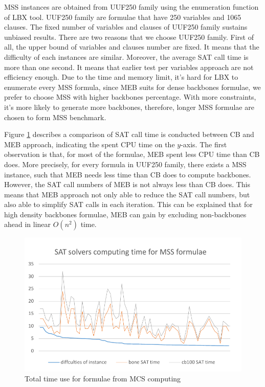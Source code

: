 MSS instances are obtained from UUF250 family using the enumeration function of LBX\cite{MPA2015} tool. UUF250 family are formulae that have 250 variables and 1065 clauses. The fixed number of variables and clauses of UUF250 family sustains unbiased results.
There are two reasons that we choose UUF250 family. First of all, the upper bound of variables and clauses number are fixed. It means that the difficulty of each instances are similar. Moreover, the average SAT call time is more than one second. It means that earlier test per variables approach are not efficiency enough.
Due to the time and memory limit, it's hard for LBX to enumerate every MSS formula, since MEB suits for dense backbones formulae, we prefer to choose MSS with higher backbones percentage. With more constraints, it's more likely to generate more backbones, therefore, longer MSS formulae are chosen to form MSS benchmark.

Figure \ref{fig:mcs-time} describes a comparison of SAT call time is conducted between CB and MEB approach, indicating the spent CPU time on the $y$-axis. The first observation is that, for most of the formulae, MEB spent less CPU time than CB does. More precisely, for every formula in UUF250 family, there exists a MSS instance, such that MEB needs less time than CB does to compute backbones. However, the SAT call numbers of MEB is not always less than CB does. This means that MEB approach not only able to reduce the SAT call numbers, but also able to simplify SAT calls in each iteration. This can be explained that for high density backbones formulae, MEB can gain by excluding non-backbones ahead in linear $O(n^2)$ time.

\begin{figure}
    \centering
    \includegraphics[scale=0.7]{mcs.pdf}
   \caption{Total time use for formulae from MCS computing}
   \label{fig:mcs-time}
\end{figure}

